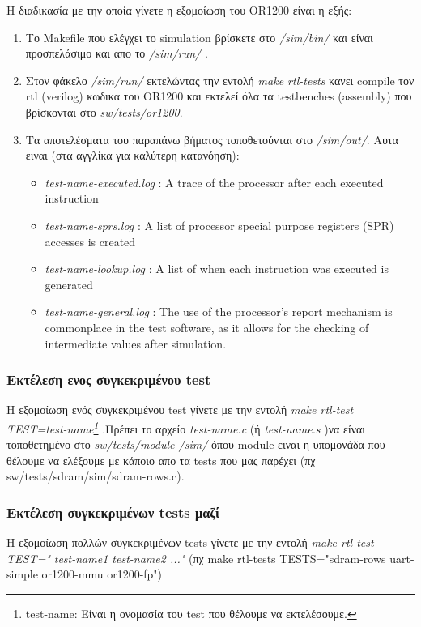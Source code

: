 \documentclass[a4paper,10pt]{article}
\numberwithin{figure}{section}
\numberwithin{table}{section}
\begin{document}
{{{{Η διαδικασία με την οποία γίνετε η εξομοίωση του OR1200 είναι η εξής:
\begin{enumerate}
 \item Το Makefile που ελέγχει το simulation βρίσκετε στο \emph{/sim/bin/} και είναι προσπελάσιμο και απο το \emph{/sim/run/} .
 \item Στον φάκελο \emph{/sim/run/} εκτελώντας την εντολή \emph{make rtl-tests} κανει compile τον rtl
(verilog) κωδικα του OR1200 και εκτελεί όλα τα testbenches (assembly) που βρίσκονται στο \emph{sw/tests/or1200}.
 \item Tα αποτελέσματα του παραπάνω βήματος τοποθετούνται στο \emph{/sim/out/}. Aυτα ειναι (στα αγγλίκα για καλύτερη κατανόηση):
    \begin{itemize}
     \item \emph{test-name-executed.log} : A trace of the processor after each executed instruction
     \item \emph{test-name-sprs.log} : A list of processor special purpose registers (SPR) accesses is created
     \item \emph{test-name-lookup.log} : A list of when each instruction was executed is generated
     \item \emph{test-name-general.log} : The use of the processor’s report mechanism is commonplace in the
test software, as it allows for the checking of intermediate values after simulation.
    \end{itemize}
\end{enumerate}
}

\subsubsection{ Εκτέλεση ενος συγκεκριμένου test}
{

Η εξομοίωση ενός συγκεκριμένου test γίνετε με την εντολή
\emph{make rtl-test TEST=test-name\footnote{test-name: Είναι η ονομασία του test που θέλουμε να εκτελέσουμε.}} .Πρέπει το αρχείο \emph{test-name.c}
 (ή \emph{test-name.s} )να είναι τοποθετημένο στο \emph{sw/tests/module /sim/ } όπου module ειναι η υπομονάδα που θέλουμε να ελέξουμε με κάποιο απο τα tests που μας παρέχει 
(πχ sw/tests/sdram/sim/sdram-rows.c).
}

\subsubsection{Εκτέλεση συγκεκριμένων tests μαζί}
{

Η εξομοίωση πολλών συγκεκριμένων tests γίνετε με την εντολή \emph{make rtl-test TEST=" test-name1 test-name2 ..."} (πχ make rtl-tests TESTS="sdram-rows uart-simple or1200-mmu or1200-fp")
}


}}}
\end{document}

